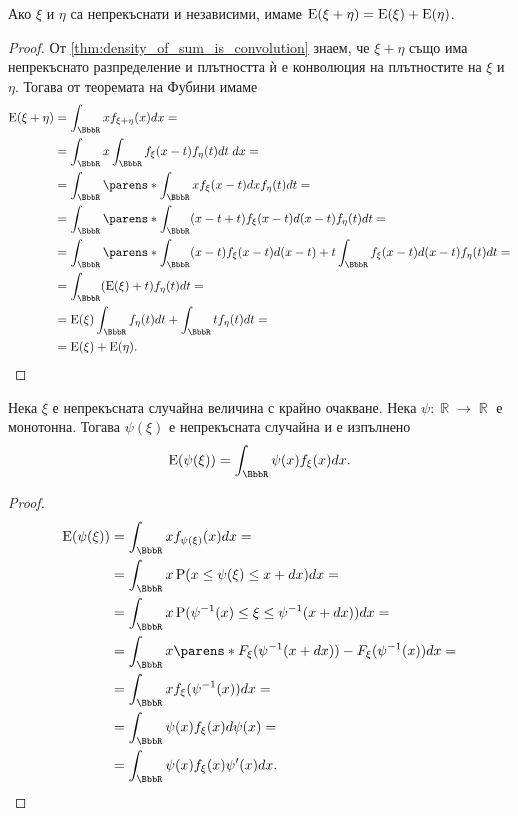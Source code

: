 \documentclass{../../common/topic}
\begin{document}
\begin{proposition}\label{thm:expectation_is_additive}
  Ако \( \xi \) и \( \eta \) са непрекъснати и независими, имаме \( \operatorname{E}(\xi + \eta) = \operatorname{E}(\xi) + \operatorname{E}(\eta) \).
\end{proposition}
\begin{proof}
  От \cref{thm:density_of_sum_is_convolution} знаем, че \( \xi + \eta \) също има непрекъснато разпределение и плътността ѝ е конволюция на плътностите на \( \xi \) и \( \eta \). Тогава от теоремата на Фубини имаме
  \begin{align*}
    \Expect(\xi + \eta)
    &=
    \int_{\BbbR} x f_{\xi + \eta} (x) dx
    = \\ &=
    \int_{\BbbR} x \int_{\BbbR} f_\xi(x - t) f_\eta(t) dt \; dx
    = \\ &=
    \int_{\BbbR} \parens*{ \int_{\BbbR} x f_\xi(x - t) dx } f_\eta(t) dt
    = \\ &=
    \int_{\BbbR} \parens*{ \int_{\BbbR} (x - t + t) f_\xi(x - t) d(x - t) } f_\eta(t) dt
    = \\ &=
    \int_{\BbbR} \parens*{ \int_{\BbbR} (x - t) f_\xi(x - t) d(x - t) + t \int_{\BbbR} f_\xi(x - t) d(x - t) } f_\eta(t) dt
    = \\ &=
    \int_{\BbbR} (\Expect(\xi) + t) f_\eta(t) dt
    = \\ &=
    \Expect(\xi) \int_{\BbbR} f_\eta(t) dt + \int_{\BbbR} t f_\eta(t) dt
    = \\ &=
    \Expect(\xi) + \Expect(\eta).
  \end{align*}
\end{proof}

\begin{proposition}\label{thm:lotus}
  Нека \( \xi \) е непрекъсната случайна величина с крайно очакване. Нека \( \psi: \BbbR \to \BbbR \) е монотонна. Тогава \( \psi(\xi) \) е непрекъсната случайна и е изпълнено
  \begin{equation*}
    \Expect(\psi(\xi))
    =
    \int_{\BbbR} \psi(x) f_\xi(x) dx.
  \end{equation*}
\end{proposition}

\begin{proof}
  \begin{align*}
    \Expect(\psi(\xi))
    &=
    \int_{\BbbR} x f_{\psi(\xi)}(x) dx
    = \\ &=
    \int_{\BbbR} x \Prob(x \leq \psi(\xi) \leq x + dx) dx
    = \\ &=
    \int_{\BbbR} x \Prob(\psi^{-1}(x) \leq \xi \leq \psi^{-1}(x + dx)) dx
    = \\ &=
    \int_{\BbbR} x \parens*{ F_\xi(\psi^{-1}(x + dx)) - F_\xi(\psi^{-1}(x)) } dx
    = \\ &=
    \int_{\BbbR} x f_\xi(\psi^{-1}(x)) dx
    = \\ &=
    \int_{\BbbR} \psi(x) f_\xi(x) d \psi(x)
    = \\ &=
    \int_{\BbbR} \psi(x) f_\xi(x) \psi'(x) dx.
  \end{align*}
\end{proof}
\end{document}

